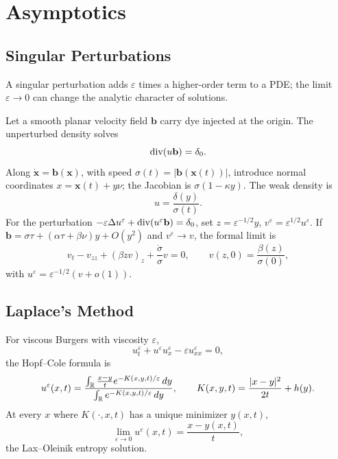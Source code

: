 \section{Asymptotics}
\label{sec:asymptotics}

\subsection{Singular Perturbations}
\label{sec:singular-perturbations}

\begin{definition}
\label{def:singular-perturbation}
A singular perturbation adds $\varepsilon$ times a higher-order term to a PDE;
the limit $\varepsilon\to0$ can change the analytic character of solutions.
\end{definition}

\begin{example}
\label{ex:transport-small-diffusion-singular-perturbation}

Let a smooth planar velocity field $\mathbf b$ carry dye injected at the
origin. The unperturbed density solves
\[
\operatorname{div}(u\mathbf b)=\delta_0.
\]
Along $\dot{\mathbf x}=\mathbf b(\mathbf x)$, with speed
$\sigma(t)=|\mathbf b(\mathbf x(t))|$, introduce normal coordinates
$x=\mathbf x(t)+y\nu$; the Jacobian is $\sigma(1-\kappa y)$. The weak density is
\[
u=\frac{\delta(y)}{\sigma(t)}.
\]
For the perturbation $-\varepsilon\Delta u^\varepsilon+\operatorname{div}(u^\varepsilon\mathbf b)=\delta_0$,
set $z=\varepsilon^{-1/2}y$, $v^\varepsilon=\varepsilon^{1/2}u^\varepsilon$.
If
$\mathbf b=\sigma\tau+(\alpha\tau+\beta\nu)y+O(y^2)$ and
$v^\varepsilon\to v$, the formal limit is
\[
v_t-v_{zz}+(\beta zv)_z+\frac{\dot\sigma}{\sigma}v=0,
\qquad
v(z,0)=\frac{\beta(z)}{\sigma(0)},
\]
with $u^\varepsilon=\varepsilon^{-1/2}(v+o(1))$.
\end{example}

\subsection{Laplace's Method}
\label{sec:laplaces-method}

\begin{example}
\label{ex:vanishing-viscosity-burgers}

For viscous Burgers with viscosity $\varepsilon$,
\[
u_t^\varepsilon+u^\varepsilon u_x^\varepsilon-\varepsilon u_{xx}^\varepsilon=0,
\]
the Hopf--Cole formula is
\[
u^\varepsilon(x,t)=
\frac{\int_{\mathbb{R}} \frac{x-y}{t}e^{-K(x,y,t)/\varepsilon}\,dy}
{\int_{\mathbb{R}} e^{-K(x,y,t)/\varepsilon}\,dy},
\qquad
K(x,y,t)=\frac{|x-y|^2}{2t}+h(y).
\]
At every $x$ where $K(\cdot,x,t)$ has a unique minimizer $y(x,t)$,
\[
\lim_{\varepsilon\to0}u^\varepsilon(x,t)=\frac{x-y(x,t)}t,
\]
the Lax--Oleinik entropy solution.
\end{example}

